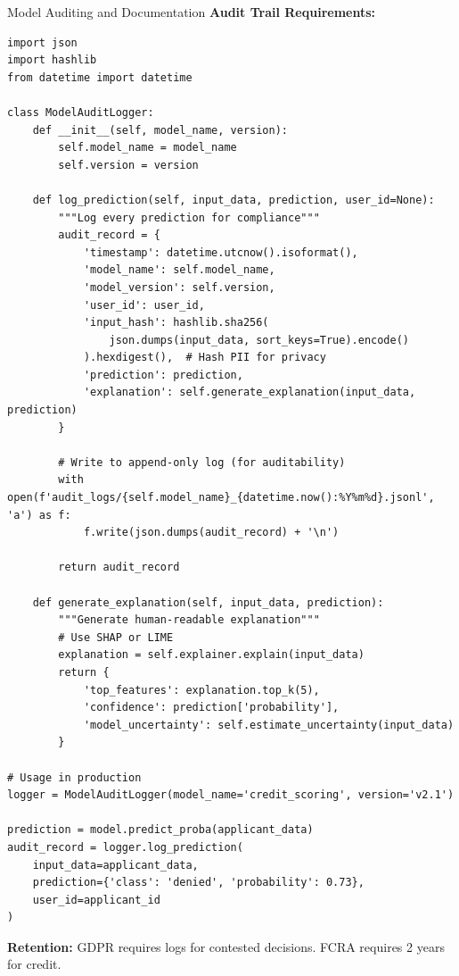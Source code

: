 \begin{frame}[fragile]{Model Auditing and Documentation}
\textbf{Audit Trail Requirements:}
\begin{lstlisting}[basicstyle=\ttfamily\tiny]
import json
import hashlib
from datetime import datetime

class ModelAuditLogger:
    def __init__(self, model_name, version):
        self.model_name = model_name
        self.version = version

    def log_prediction(self, input_data, prediction, user_id=None):
        """Log every prediction for compliance"""
        audit_record = {
            'timestamp': datetime.utcnow().isoformat(),
            'model_name': self.model_name,
            'model_version': self.version,
            'user_id': user_id,
            'input_hash': hashlib.sha256(
                json.dumps(input_data, sort_keys=True).encode()
            ).hexdigest(),  # Hash PII for privacy
            'prediction': prediction,
            'explanation': self.generate_explanation(input_data, prediction)
        }

        # Write to append-only log (for auditability)
        with open(f'audit_logs/{self.model_name}_{datetime.now():%Y%m%d}.jsonl', 'a') as f:
            f.write(json.dumps(audit_record) + '\n')

        return audit_record

    def generate_explanation(self, input_data, prediction):
        """Generate human-readable explanation"""
        # Use SHAP or LIME
        explanation = self.explainer.explain(input_data)
        return {
            'top_features': explanation.top_k(5),
            'confidence': prediction['probability'],
            'model_uncertainty': self.estimate_uncertainty(input_data)
        }

# Usage in production
logger = ModelAuditLogger(model_name='credit_scoring', version='v2.1')

prediction = model.predict_proba(applicant_data)
audit_record = logger.log_prediction(
    input_data=applicant_data,
    prediction={'class': 'denied', 'probability': 0.73},
    user_id=applicant_id
)
\end{lstlisting}

\textbf{Retention:} GDPR requires logs for contested decisions. FCRA requires 2 years for credit.
\end{frame}


